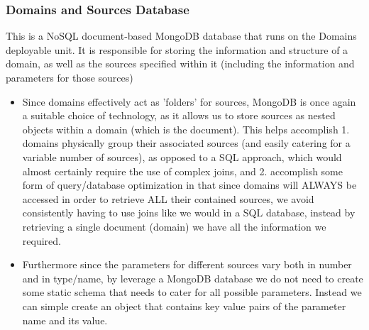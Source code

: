 \documentclass[12pt]{article}
\begin{document}
\subsubsection{Domains and Sources Database}
This is a NoSQL document-based MongoDB database that runs on the Domains deployable unit. It is responsible for storing the information and structure of a domain, as well as the sources specified within it (including the information and parameters for those sources)
\begin{itemize}
    \item Since domains effectively act as 'folders' for sources, MongoDB is once again a suitable choice of technology, as it allows us to store sources as nested objects within a domain (which is the document). This helps accomplish 1. domains physically group their associated sources (and easily catering for a variable number of sources), as opposed to a SQL approach, which would almost certainly require the use of complex joins, and 2. accomplish some form of query/database optimization in that since domains will ALWAYS be accessed in order to retrieve ALL their contained sources, we avoid consistently having to use joins like we would in a SQL database, instead by retrieving a single document (domain) we have all the information we required.
    \item Furthermore since the parameters for different sources vary both in number and in type/name, by leverage a MongoDB database we do not need to create some static schema that needs to cater for all possible parameters. Instead we can simple create an object that contains key value pairs of the parameter name and its value.
\end{itemize}
\end{document}
